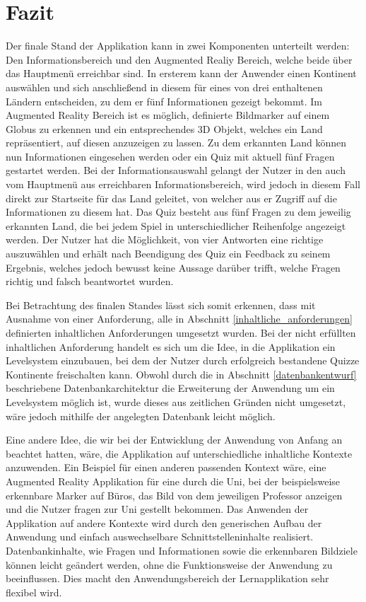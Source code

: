 \chapter{Fazit}\label{ch:fazit}
Der finale Stand der Applikation kann in zwei Komponenten unterteilt werden: Den Informationsbereich und den Augmented Realiy Bereich, welche beide über das Hauptmenü erreichbar sind.
In ersterem kann der Anwender einen Kontinent auswählen und sich anschließend in diesem für eines von drei enthaltenen Ländern entscheiden, zu dem er fünf Informationen gezeigt bekommt.
Im Augmented Reality Bereich ist es möglich, definierte Bildmarker auf einem Globus zu erkennen und ein entsprechendes 3D Objekt, welches ein Land repräsentiert, auf diesen anzuzeigen zu lassen.
Zu dem erkannten Land können nun Informationen eingesehen werden oder ein Quiz mit aktuell fünf Fragen gestartet werden. 
Bei der Informationsauswahl gelangt der Nutzer in den auch vom Hauptmenü aus erreichbaren Informationsbereich, wird jedoch in diesem Fall direkt zur Startseite für das Land geleitet, von welcher aus er Zugriff auf die Informationen zu diesem hat.
Das Quiz besteht aus fünf Fragen zu dem jeweilig erkannten Land, die bei jedem Spiel in unterschiedlicher Reihenfolge angezeigt werden.
Der Nutzer hat die Möglichkeit, von vier Antworten eine richtige auszuwählen und erhält nach Beendigung des Quiz ein Feedback zu seinem Ergebnis, welches jedoch bewusst keine Aussage darüber trifft, welche Fragen richtig und falsch beantwortet wurden.

Bei Betrachtung des finalen Standes lässt sich somit erkennen, dass mit Ausnahme von einer Anforderung, alle in Abschnitt \ref{inhaltliche_anforderungen} definierten inhaltlichen Anforderungen umgesetzt wurden.
Bei der nicht erfüllten inhaltlichen Anforderung handelt es sich um die Idee, in die Applikation ein Levelsystem einzubauen, bei dem der Nutzer durch erfolgreich bestandene Quizze Kontinente freischalten kann.
Obwohl durch die in Abschnitt \ref{datenbankentwurf} beschriebene Datenbankarchitektur die Erweiterung der Anwendung um ein Levelsystem möglich ist, wurde dieses aus zeitlichen Gründen nicht umgesetzt, wäre jedoch mithilfe der angelegten Datenbank leicht möglich.

Eine andere Idee, die wir bei der Entwicklung der Anwendung von Anfang an beachtet hatten, wäre, die Applikation auf unterschiedliche inhaltliche Kontexte anzuwenden.
Ein Beispiel für einen anderen passenden Kontext wäre, eine Augmented Reality Applikation für eine  durch die Uni, bei der beispielsweise erkennbare Marker auf Büros, das Bild von dem jeweiligen Professor anzeigen und die Nutzer fragen zur Uni gestellt bekommen.
Das Anwenden der Applikation auf andere Kontexte wird durch den generischen Aufbau der Anwendung und einfach auswechselbare Schnittstelleninhalte realisiert.
Datenbankinhalte, wie Fragen und Informationen sowie die erkennbaren Bildziele können leicht geändert werden, ohne die Funktionsweise der Anwendung zu beeinflussen. Dies macht den Anwendungsbereich der Lernapplikation sehr flexibel wird.


